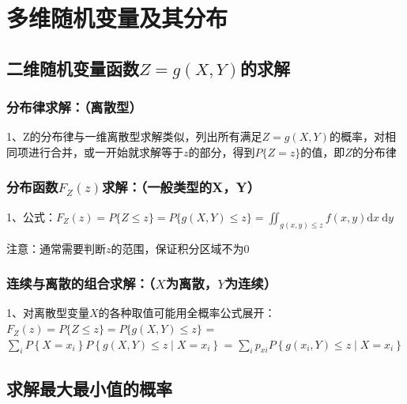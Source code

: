 \chapter{多维随机变量及其分布}

\section{二维随机变量函数$Z=g(X, Y)$的求解}



\subsection{分布律求解：（离散型）}

1、Z的分布律与一维离散型求解类似，列出所有满足$Z=g(X, Y)$的概率，对相同项进行合并，或一开始就求解等于$z$的部分，得到$P\{Z = z\}$的值，即$Z$的分布律



\subsection{分布函数$F_Z(z)$求解：（一般类型的X，Y）}

1、公式：$F_{Z}(z)=P\{Z \leqslant z\}=P\{g(X, Y) \leqslant z\}=\iint_{g(x, y) \leqslant z} f(x, y) \mathrm{d} x \mathrm{~d} y$

注意：通常需要判断$z$的范围，保证积分区域不为0



\subsection{连续与离散的组合求解：（$X$为离散，$Y$为连续）}

1、对离散型变量$X$的各种取值可能用全概率公式展开：$F_{Z}(z)=P\{Z \leqslant z\}=P\{g(X, Y) \leqslant z\}$ = $\sum_{i} P\left\{X=x_{i}\right\} P\left\{g(X, Y) \leqslant z \mid X=x_{i}\right\}$ = $\sum_{i} p_{xi} P\left\{g\left(x_{i}, Y\right) \leqslant z \mid X=x_{i}\right\}$

\section{求解最大最小值的概率}



